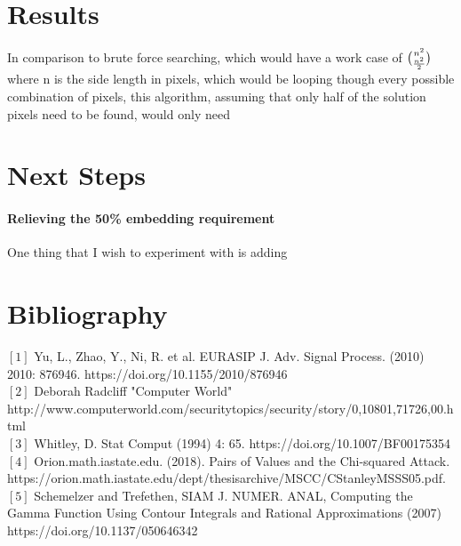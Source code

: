 \documentclass[12pt]{article}
\begin{document}
\section{Results}
In comparison to brute force searching, which would have a work case of $ {  { n^2 } \choose  { { n^2 } \over 2 } } $ where n is the side length in pixels, which would be looping though every possible combination of pixels, this algorithm, assuming that only half of the solution pixels need to be found, would only need $ {  } $


\section{Next Steps}
\paragraph{Relieving the 50\% embedding requirement}
\par One thing that I wish to experiment with is adding 


\section{Bibliography}
$[1]$ Yu, L., Zhao, Y., Ni, R. et al. EURASIP J. Adv. Signal Process. (2010) 2010: 876946. https://doi.org/10.1155/2010/876946 \\
$[2]$ Deborah Radcliff "Computer World" http://www.computerworld.com/securitytopics/security/story/0,10801,71726,00.html \\
$[3]$ Whitley, D. Stat Comput (1994) 4: 65. https://doi.org/10.1007/BF00175354 \\
$[4]$ Orion.math.iastate.edu. (2018). Pairs of Values and the Chi-squared Attack. https://orion.math.iastate.edu/dept/thesisarchive/MSCC/CStanleyMSSS05.pdf. \\
$[5]$ Schemelzer and Trefethen, SIAM J. NUMER. ANAL, Computing the Gamma Function Using Contour Integrals and Rational Approximations (2007) https://doi.org/10.1137/050646342
\end{document}
